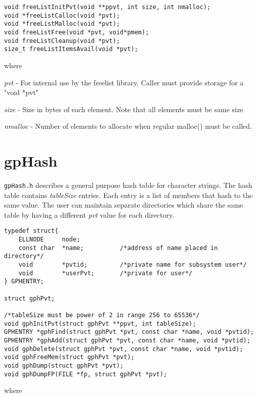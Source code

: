 \begin{verbatim}void freeListInitPvt(void **ppvt, int size, int nmalloc);
void *freeListCalloc(void *pvt);
void *freeListMalloc(void *pvt);
void freeListFree(void *pvt, void*pmem);
void freeListCleanup(void *pvt);
size_t freeListItemsAvail(void *pvt);
\end{verbatim}
where

\begin{description}\item \emph{pvt}  - For internal use by the freelist library. Caller must provide storage for a "void *pvt"

\item \emph{size} - Size in bytes of each element. Note that all elements must be same size

\item \emph{nmalloc} - Number of elements to allocate when regular malloc() must be called.

\end{description}\section{gpHash}

\verb|gpHash.h| describes a general purpose hash table for character strings. The hash table contains \emph{tableSize} entries. Each 
entry is a list of members that hash to the same value. The user can maintain separate directories which share the same 
table by having a different \emph{pvt} value for each directory.

\begin{verbatim}typedef struct{
    ELLNODE     node;
    const char  *name;          /*address of name placed in directory*/
    void        *pvtid;         /*private name for subsystem user*/
    void        *userPvt;       /*private for user*/
} GPHENTRY;

struct gphPvt;

/*tableSize must be power of 2 in range 256 to 65536*/
void gphInitPvt(struct gphPvt **ppvt, int tableSize);
GPHENTRY *gphFind(struct gphPvt *pvt, const char *name, void *pvtid);
GPHENTRY *gphAdd(struct gphPvt *pvt, const char *name, void *pvtid);
void gphDelete(struct gphPvt *pvt, const char *name, void *pvtid);
void gphFreeMem(struct gphPvt *pvt);
void gphDump(struct gphPvt *pvt);
void gphDumpFP(FILE *fp, struct gphPvt *pvt);
\end{verbatim}
where

